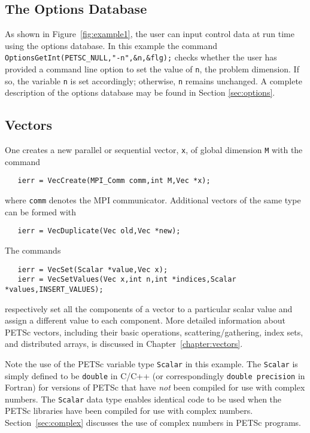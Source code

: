 \subsection*{The Options Database}

As shown in Figure~\ref{fig:example1}, the user can input control data
at run time using the options database. In this example the command
{\tt OptionsGetInt(PETSC\_NULL,"-n",\&n,\&flg);} checks whether the user has
provided a command line option to set the value of {\tt n}, the
problem dimension.  If so, the variable {\tt n} is set accordingly;
otherwise, {\tt n} remains unchanged. A complete description of the
options database may be found in Section \ref{sec:options}.

\subsection*{Vectors}

One creates a new parallel or 
sequential vector, {\tt x}, of global dimension {\tt M} with the 
command  
\begin{verbatim}
   ierr = VecCreate(MPI_Comm comm,int M,Vec *x);
\end{verbatim}
where {\tt comm} denotes the MPI communicator.
Additional vectors of the same type can be formed with
\begin{verbatim}
   ierr = VecDuplicate(Vec old,Vec *new);
\end{verbatim}
The commands  
\begin{verbatim}
   ierr = VecSet(Scalar *value,Vec x);
   ierr = VecSetValues(Vec x,int n,int *indices,Scalar *values,INSERT_VALUES);
\end{verbatim}
respectively set all the components of a vector to a particular scalar
value and assign a different value to each component.  More
detailed information about PETSc vectors, including their basic
operations, scattering/gathering, index sets, and distributed arrays, is
discussed in Chapter~\ref{chapter:vectors}.

 
Note the use of the PETSc variable type {\tt Scalar} in this example.
The {\tt Scalar} is simply defined to be {\tt double} in C/C++
(or correspondingly {\tt double precision} in Fortran) for versions of
PETSc that have {\em not} been compiled for use with complex numbers.
The {\tt Scalar} data type enables
identical code to be used when the PETSc libraries have been compiled
for use with complex numbers.  Section~\ref{sec:complex} discusses the
use of complex numbers in PETSc programs.


